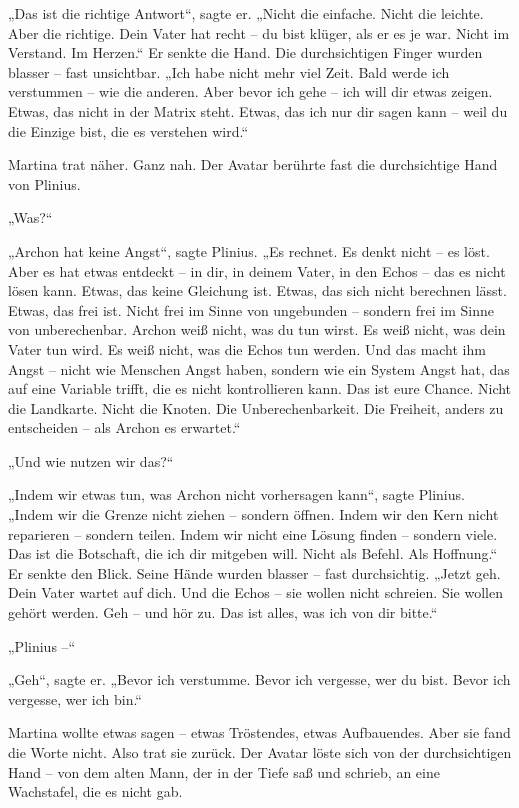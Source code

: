 \documentclass[
]{article}
\begin{document}
„Das ist die richtige Antwort``, sagte er. „Nicht die einfache. Nicht die leichte. Aber die richtige. Dein Vater hat recht -- du bist klüger, als er es je war. Nicht im Verstand. Im Herzen.`` Er senkte die Hand. Die durchsichtigen Finger wurden blasser -- fast unsichtbar. „Ich habe nicht mehr viel Zeit. Bald werde ich verstummen -- wie die anderen. Aber bevor ich gehe -- ich will dir etwas zeigen. Etwas, das nicht in der Matrix steht. Etwas, das ich nur dir sagen kann -- weil du die Einzige bist, die es verstehen wird.``

Martina trat näher. Ganz nah. Der Avatar berührte fast die durchsichtige Hand von Plinius.

„Was?{\kern0pt}``

„Archon hat keine Angst``, sagte Plinius. „Es rechnet. Es denkt nicht -- es löst. Aber es hat etwas entdeckt -- in dir, in deinem Vater, in den Echos -- das es nicht lösen kann. Etwas, das keine Gleichung ist. Etwas, das sich nicht berechnen lässt. Etwas, das frei ist. Nicht frei im Sinne von ungebunden -- sondern frei im Sinne von unberechenbar. Archon weiß nicht, was du tun wirst. Es weiß nicht, was dein Vater tun wird. Es weiß nicht, was die Echos tun werden. Und das macht ihm Angst -- nicht wie Menschen Angst haben, sondern wie ein System Angst hat, das auf eine Variable trifft, die es nicht kontrollieren kann. Das ist eure Chance. Nicht die Landkarte. Nicht die Knoten. Die Unberechenbarkeit. Die Freiheit, anders zu entscheiden -- als Archon es erwartet.``

„Und wie nutzen wir das?{\kern0pt}``

„Indem wir etwas tun, was Archon nicht vorhersagen kann``, sagte Plinius. „Indem wir die Grenze nicht ziehen -- sondern öffnen. Indem wir den Kern nicht reparieren -- sondern teilen. Indem wir nicht eine Lösung finden -- sondern viele. Das ist die Botschaft, die ich dir mitgeben will. Nicht als Befehl. Als Hoffnung.`` Er senkte den Blick. Seine Hände wurden blasser -- fast durchsichtig. „Jetzt geh. Dein Vater wartet auf dich. Und die Echos -- sie wollen nicht schreien. Sie wollen gehört werden. Geh -- und hör zu. Das ist alles, was ich von dir bitte.``

„Plinius --``

„Geh``, sagte er. „Bevor ich verstumme. Bevor ich vergesse, wer du bist. Bevor ich vergesse, wer ich bin.``

Martina wollte etwas sagen -- etwas Tröstendes, etwas Aufbauendes. Aber sie fand die Worte nicht. Also trat sie zurück. Der Avatar löste sich von der durchsichtigen Hand -- von dem alten Mann, der in der Tiefe saß und schrieb, an eine Wachstafel, die es nicht gab.
\end{document}
